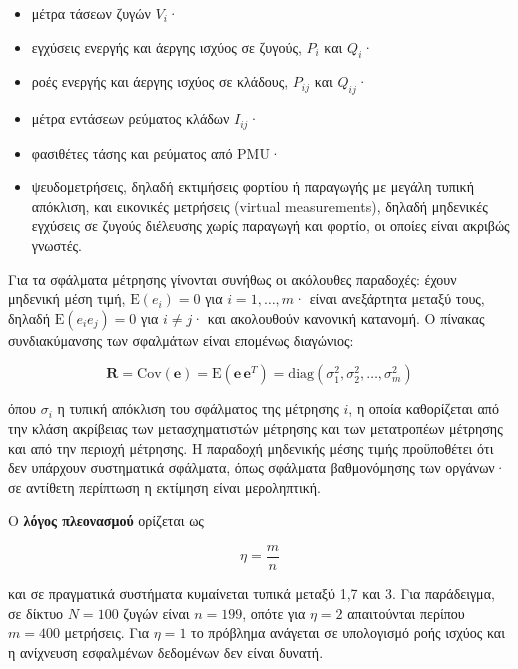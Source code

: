 \begin{itemize}
\item μέτρα τάσεων ζυγών $V_i$·
\item εγχύσεις ενεργής και άεργης ισχύος σε ζυγούς, $P_i$ και $Q_i$·
\item ροές ενεργής και άεργης ισχύος σε κλάδους, $P_{ij}$ και $Q_{ij}$·
\item μέτρα εντάσεων ρεύματος κλάδων $I_{ij}$·
\item φασιθέτες τάσης και ρεύματος από PMU·
\item ψευδομετρήσεις, δηλαδή εκτιμήσεις φορτίου ή παραγωγής με μεγάλη τυπική απόκλιση, και
      εικονικές μετρήσεις (virtual measurements), δηλαδή μηδενικές εγχύσεις σε ζυγούς
      διέλευσης χωρίς παραγωγή και φορτίο, οι οποίες είναι ακριβώς γνωστές.
\end{itemize}

Για τα σφάλματα μέτρησης γίνονται συνήθως οι ακόλουθες παραδοχές: έχουν μηδενική μέση τιμή,
$\mathrm{E}(e_i) = 0$ για $i = 1, \ldots, m$· είναι ανεξάρτητα μεταξύ τους, δηλαδή
$\mathrm{E}(e_i e_j) = 0$ για $i \neq j$· και ακολουθούν κανονική κατανομή. Ο πίνακας
συνδιακύμανσης των σφαλμάτων είναι επομένως διαγώνιος:

\begin{equation}
\mathbf{R} = \mathrm{Cov}(\mathbf{e}) = \mathrm{E}\left(\mathbf{e}\,\mathbf{e}^{T}\right)
  = \mathrm{diag}\left(\sigma_1^2, \sigma_2^2, \ldots, \sigma_m^2\right)
\label{eq:covR}
\end{equation}

όπου $\sigma_i$ η τυπική απόκλιση του σφάλματος της μέτρησης $i$, η οποία καθορίζεται από την
κλάση ακρίβειας των μετασχηματιστών μέτρησης και των μετατροπέων
μέτρησης και από την περιοχή μέτρησης. Η παραδοχή μηδενικής μέσης τιμής προϋποθέτει ότι δεν
υπάρχουν συστηματικά σφάλματα, όπως σφάλματα βαθμονόμησης των οργάνων· σε αντίθετη περίπτωση η
εκτίμηση είναι μεροληπτική.

Ο \textbf{λόγος πλεονασμού} ορίζεται ως

\begin{equation}
\eta = \frac{m}{n}
\label{eq:redundancy}
\end{equation}

και σε πραγματικά συστήματα κυμαίνεται τυπικά μεταξύ 1,7 και 3. Για παράδειγμα, σε δίκτυο
$N = 100$ ζυγών είναι $n = 199$, οπότε για $\eta = 2$ απαιτούνται περίπου $m = 400$
μετρήσεις. Για $\eta = 1$ το πρόβλημα ανάγεται σε υπολογισμό ροής ισχύος και η ανίχνευση
εσφαλμένων δεδομένων δεν είναι δυνατή.

